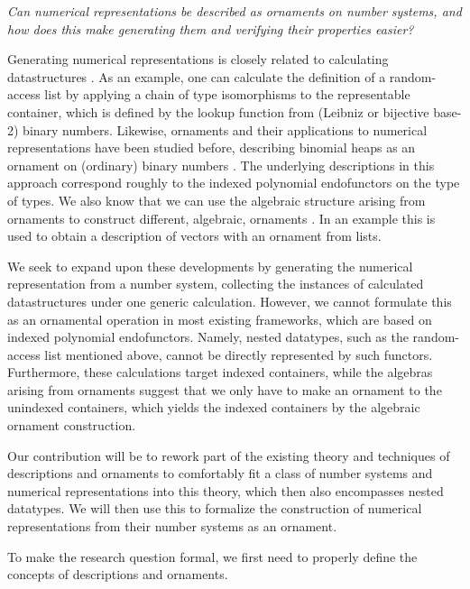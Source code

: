 \textit{Can numerical representations be described as ornaments on number systems, and how does this make generating them and verifying their properties easier?}

Generating numerical representations is closely related to calculating datastructures \cite{calcdata}. As an example, one can calculate the definition of a random-access list by applying a chain of type isomorphisms to the representable container, which is defined by the lookup function from (Leibniz or bijective base-2) binary numbers. Likewise, ornaments and their applications to numerical representations have been studied before, describing binomial heaps as an ornament on (ordinary) binary numbers \cite{progorn}. The underlying descriptions in this approach correspond roughly to the indexed polynomial endofunctors on the type of types. We also know that we can use the algebraic structure arising from ornaments to construct different, algebraic, ornaments \cite{algorn}. In an example this is used to obtain a description of vectors with an ornament from lists.

We seek to expand upon these developments by generating the numerical representation from a number system, collecting the instances of calculated datastructures under one generic calculation. However, we cannot formulate this as an ornamental operation in most existing frameworks, which are based on indexed polynomial endofunctors. Namely, nested datatypes, such as the random-access list mentioned above, cannot be directly represented by such functors. Furthermore, these calculations target indexed containers, while the algebras arising from ornaments suggest that we only have to make an ornament to the unindexed containers, which yields the indexed containers by the algebraic ornament construction.

Our contribution will be to rework part of the existing theory and techniques of descriptions and ornaments to comfortably fit a class of number systems and numerical representations into this theory, which then also encompasses nested datatypes. We will then use this to formalize the construction of numerical representations from their number systems as an ornament.

To make the research question formal, we first need to properly define the concepts of descriptions and ornaments.


